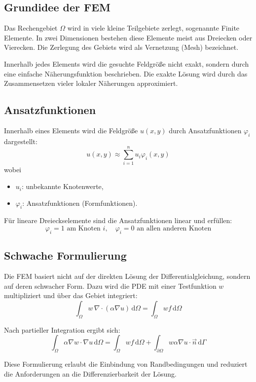 \documentclass[a4paper]{article}
\begin{document}
\subsection{Grundidee der FEM}

Das Rechengebiet $\Omega$ wird in viele kleine Teilgebiete zerlegt, sogenannte Finite Elemente. In zwei Dimensionen bestehen diese Elemente meist aus Dreiecken oder Vierecken. Die Zerlegung des Gebiets wird als Vernetzung (Mesh) bezeichnet.

Innerhalb jedes Elements wird die gesuchte Feldgröße nicht exakt, sondern durch eine einfache Näherungsfunktion beschrieben. Die exakte Lösung wird durch das Zusammensetzen vieler lokaler Näherungen approximiert.

\subsection{Ansatzfunktionen}

Innerhalb eines Elements wird die Feldgröße $u(x,y)$ durch Ansatzfunktionen $\varphi_i$ dargestellt:
\[
u(x,y) \approx \sum_{i=1}^{n} u_i \varphi_i(x,y)
\]
wobei
\begin{itemize}
    \item $u_i$: unbekannte Knotenwerte,
    \item $\varphi_i$: Ansatzfunktionen (Formfunktionen).
\end{itemize}

Für lineare Dreieckselemente sind die Ansatzfunktionen linear und erfüllen:
\[
\varphi_i = 1 \text{ am Knoten } i, \quad \varphi_i = 0 \text{ an allen anderen Knoten}
\]

\subsection{Schwache Formulierung}

Die FEM basiert nicht auf der direkten Lösung der Differentialgleichung, sondern auf deren schwacher Form. Dazu wird die PDE mit einer Testfunktion $w$ multipliziert und über das Gebiet integriert:
\[
\int_{\Omega} w \, \nabla \cdot (\alpha \nabla u)\, \mathrm{d}\Omega
= \int_{\Omega} w f \, \mathrm{d}\Omega
\]

Nach partieller Integration ergibt sich:
\[
\int_{\Omega} \alpha \nabla w \cdot \nabla u \, \mathrm{d}\Omega
= \int_{\Omega} w f \, \mathrm{d}\Omega
+ \int_{\partial \Omega} w \alpha \nabla u \cdot \vec{n} \, \mathrm{d}\Gamma
\]

Diese Formulierung erlaubt die Einbindung von Randbedingungen und reduziert die Anforderungen an die Differenzierbarkeit der Lösung.
\end{document}
